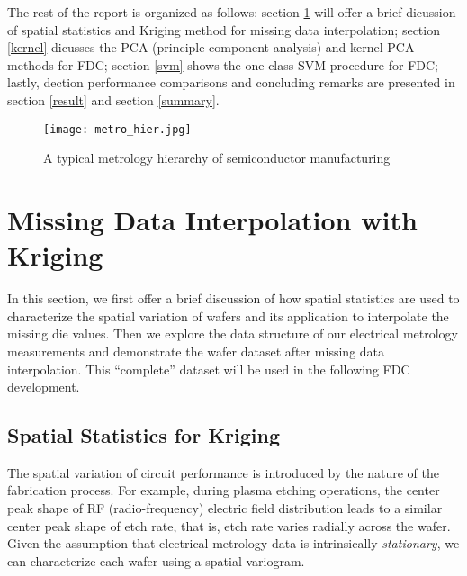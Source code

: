\documentclass[12pt]{article}
\numberwithin{equation}{section}
\numberwithin{table}{section}
\numberwithin{figure}{section}
\begin{document}
The rest of the report is organized as follows: section \ref{kriging}
will offer a brief dicussion of spatial statistics and Kriging method
for missing data interpolation; section \ref{kernel} dicusses the PCA
(principle component analysis) and kernel PCA methods for FDC; section
\ref{svm} shows the one-class SVM procedure for FDC; lastly, dection
performance comparisons and concluding remarks are presented in
section \ref{result} and section \ref{summary}.

\begin{figure} \centering
  \texttt{[image: metro\_hier.jpg]}
  \caption{A typical metrology hierarchy of semiconductor manufacturing}
  \label{metro_hier}
\end{figure}


\section{Missing Data Interpolation with Kriging} \label{kriging}

\hspace{12 pt}
In this section, we first offer a brief discussion of how spatial
statistics are used to characterize the spatial variation of wafers
and its application to interpolate the missing die values. Then we
explore the data structure of our electrical metrology
measurements and demonstrate the wafer dataset after missing data
interpolation. This ``complete'' dataset will be used in the following
FDC development.  


\subsection{Spatial Statistics for Kriging} \label{spatial}

\hspace{12 pt}
The spatial variation of circuit performance is introduced by the
nature of the fabrication process. For example, during plasma etching
operations, the center peak shape of RF (radio-frequency) electric
field distribution leads to a similar center peak shape of etch rate,
that is, etch rate varies radially across the wafer\cite{dkPHD}. Given
the assumption that electrical metrology data is intrinsically
\emph{stationary}, we can characterize each wafer using a spatial
variogram.
\end{document}
